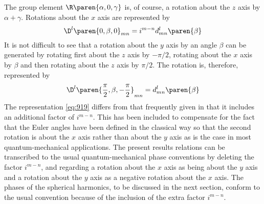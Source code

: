 %
The group element $\R\paren{\alpha, 0, \gamma}$ is, of course, a rotation about the $z$ axis by $\alpha + \gamma$. Rotations about the $x$ axis are represented by 
%
\begin{equation}
  \D^{l} \paren{0, \beta, 0}_{mn} = i^{m-n} d^{l}_{mn} \paren{\beta}
\end{equation} 
%
It is not difficult to see that a rotation about the $y$ axis by an angle $\beta$ can be generated by rotating first about the $z$ axis by $-\pi / 2$, rotating about the $x$ axis by $\beta$ and then rotating about the $z$ axis by $\pi / 2$. The rotation is, therefore, represented by
%
\begin{equation}
  \D^{l} \paren{\frac{\pi}{2}, \beta, -\frac{\pi}{2}}_{mn} = d^{l}_{mn} \paren{\beta}
\end{equation} 
%
The representation \eqref{eq:919} differs from that frequently given in that it includes an additional factor of $i^{m-n}$. This has been included to compensate for the fact that the Euler angles have been defined in the classical way so that the second rotation is about the $x$ axis rather than about the $y$ axis as is the case in most quantum-mechanical applications. The present results relations can be transcribed to the usual quantum-mechanical phase conventions by deleting the factor $i^{m-n}$, and regarding a rotation about the $x$ axis as being about the $y$ axis and a rotation about the $y$ axis as a negative rotation about the
$x$ axis. The phases of the spherical harmonics, to be discussed in the next section, conform to the usual convention because of the inclusion of the extra factor $i^{m-n}$.

\endinput